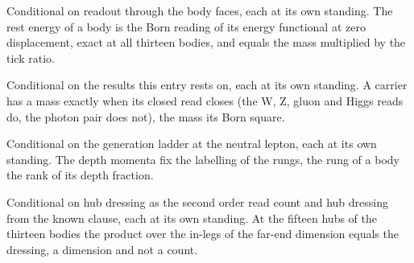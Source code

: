 \begin{chconditional}\label{box:VIII-1-mass-unit-and-the-first-power:3}
Conditional on readout through the body faces, each at its own standing. The rest energy of a body is the Born reading of its energy functional at zero displacement, exact at all thirteen bodies, and equals the mass multiplied by the tick ratio.
\end{chconditional}
\begin{chconditional}\label{box:VIII-1-mass-unit-and-the-first-power:4}
Conditional on the results this entry rests on, each at its own standing. A carrier has a mass exactly when its closed read closes (the W, Z, gluon and Higgs reads do, the photon pair does not), the mass its Born square.
\end{chconditional}
\begin{chconditional}\label{box:VIII-1-mass-unit-and-the-first-power:5}
Conditional on the generation ladder at the neutral lepton, each at its own standing. The depth momenta fix the labelling of the rungs, the rung of a body the rank of its depth fraction.
\end{chconditional}
\begin{chconditional}\label{box:VIII-1-mass-unit-and-the-first-power:6}
Conditional on hub dressing as the second order read count and hub dressing from the known clause, each at its own standing. At the fifteen hubs of the thirteen bodies the product over the in-legs of the far-end dimension equals the dressing, a dimension and not a count.
\end{chconditional}
